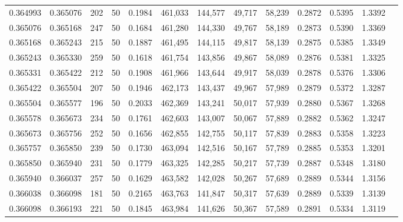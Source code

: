 \begin{tabular}{rrrrrrrrrrrrr}
0.364993 & 0.365076 &   202 &  50 &                                     0.1984 & 461,033 & 144,577 &  49,717 &  58,239 & 0.2872 & 0.5395 & 1.3392 \\
0.365076 & 0.365168 &   247 &  50 &                                     0.1684 & 461,280 & 144,330 &  49,767 &  58,189 & 0.2873 & 0.5390 & 1.3369 \\
0.365168 & 0.365243 &   215 &  50 &                                     0.1887 & 461,495 & 144,115 &  49,817 &  58,139 & 0.2875 & 0.5385 & 1.3349 \\
0.365243 & 0.365330 &   259 &  50 &                                     0.1618 & 461,754 & 143,856 &  49,867 &  58,089 & 0.2876 & 0.5381 & 1.3325 \\
0.365331 & 0.365422 &   212 &  50 &                                     0.1908 & 461,966 & 143,644 &  49,917 &  58,039 & 0.2878 & 0.5376 & 1.3306 \\
0.365422 & 0.365504 &   207 &  50 &                                     0.1946 & 462,173 & 143,437 &  49,967 &  57,989 & 0.2879 & 0.5372 & 1.3287 \\
0.365504 & 0.365577 &   196 &  50 &                                     0.2033 & 462,369 & 143,241 &  50,017 &  57,939 & 0.2880 & 0.5367 & 1.3268 \\
0.365578 & 0.365673 &   234 &  50 &                                     0.1761 & 462,603 & 143,007 &  50,067 &  57,889 & 0.2882 & 0.5362 & 1.3247 \\
0.365673 & 0.365756 &   252 &  50 &                                     0.1656 & 462,855 & 142,755 &  50,117 &  57,839 & 0.2883 & 0.5358 & 1.3223 \\
0.365757 & 0.365850 &   239 &  50 &                                     0.1730 & 463,094 & 142,516 &  50,167 &  57,789 & 0.2885 & 0.5353 & 1.3201 \\
0.365850 & 0.365940 &   231 &  50 &                                     0.1779 & 463,325 & 142,285 &  50,217 &  57,739 & 0.2887 & 0.5348 & 1.3180 \\
0.365940 & 0.366037 &   257 &  50 &                                     0.1629 & 463,582 & 142,028 &  50,267 &  57,689 & 0.2889 & 0.5344 & 1.3156 \\
0.366038 & 0.366098 &   181 &  50 &                                     0.2165 & 463,763 & 141,847 &  50,317 &  57,639 & 0.2889 & 0.5339 & 1.3139 \\
0.366098 & 0.366193 &   221 &  50 &                                     0.1845 & 463,984 & 141,626 &  50,367 &  57,589 & 0.2891 & 0.5334 & 1.3119 \\

\end{tabular}
